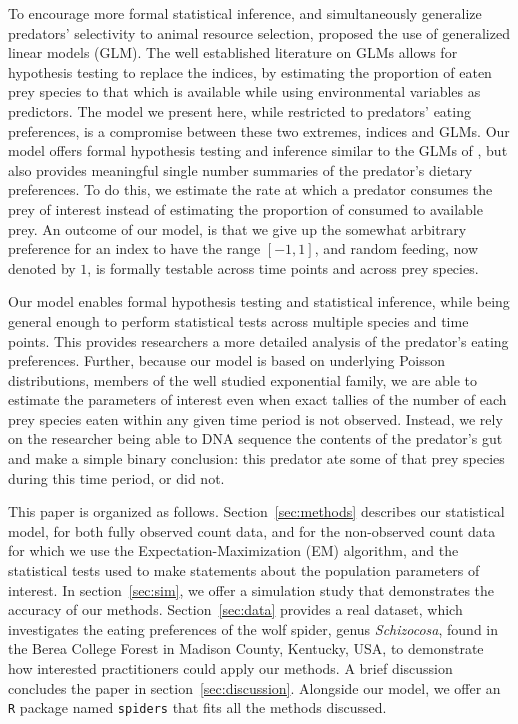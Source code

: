 To encourage more formal statistical inference, and simultaneously generalize predators' selectivity to animal resource selection, \citet{Manly:1992} proposed the use of generalized linear models (GLM).  The well established literature on GLMs allows for hypothesis testing to replace the indices, by estimating the proportion of eaten prey species to that which is available while using environmental variables as predictors.  The model we present here, while restricted to predators' eating preferences, is a compromise between these two extremes, indices and GLMs.  Our model offers formal hypothesis testing and inference similar to the GLMs of \citet{Manly:1992}, but also provides meaningful single number summaries of the predator's dietary preferences.  To do this, we estimate the rate at which a predator consumes the prey of interest instead of estimating the proportion of consumed to available prey.  An outcome of our model, is that we give up the somewhat arbitrary preference for an index to have the range $[-1,1]$, and random feeding, now denoted by $1$, is formally testable across time points and across prey species.

Our model enables formal hypothesis testing and statistical inference, while being general enough to perform statistical tests across multiple species and time points.  This provides researchers a more detailed analysis of the predator's eating preferences.  Further, because our model is based on underlying Poisson distributions, members of the well studied exponential family, we are able to estimate the parameters of interest even when exact tallies of the number of each prey species eaten within any given time period is not observed.  Instead, we rely on the researcher being able to DNA sequence the contents of the predator's gut and make a simple binary conclusion: this predator ate some of that prey species during this time period, or did not.  

This paper is organized as follows.  Section~\ref{sec:methods} describes our statistical model, for both fully observed count data, and for the non-observed count data for which we use the Expectation-Maximization (EM) algorithm, and the statistical tests used to make statements about the population parameters of interest.  In section~\ref{sec:sim}, we offer a simulation study that demonstrates the accuracy of our methods.  Section~\ref{sec:data} provides a real dataset, which investigates the eating preferences of the wolf spider, genus \textit{Schizocosa}, found in the Berea College Forest in Madison County, Kentucky, USA, to demonstrate how interested practitioners could apply our methods.  A brief discussion concludes the paper in section~\ref{sec:discussion}.  Alongside our model, we offer an \texttt{R} \citep{Core-Team:2014} package named \texttt{spiders} that fits all the methods discussed.  

